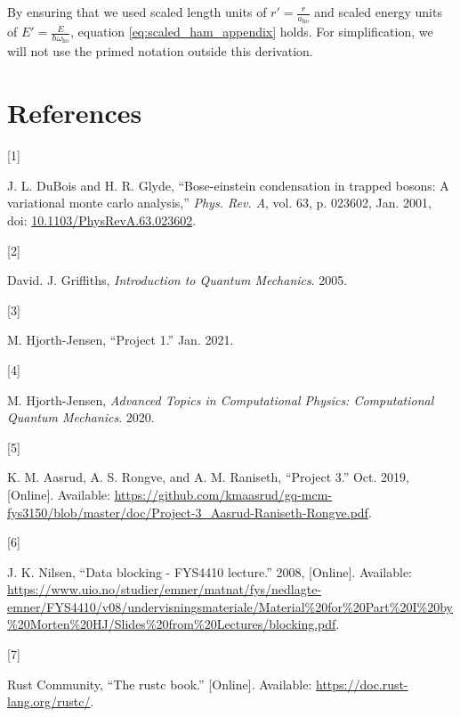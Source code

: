 \documentclass[
]{article}
\newlength{\cslhangindent}
\newlength{\csllabelwidth}
\newenvironment{CSLReferences}[2] %
 {%
  \setlength{\parindent}{0pt}
  \ifodd #1 \everypar{\setlength{\hangindent}{\cslhangindent}}\ignorespaces\fi
  \ifnum #2 > 0
  \setlength{\parskip}{#2\baselineskip}
  \fi
 }%
 {}
\newcommand{\CSLLeftMargin}[1]{\parbox[t]{\csllabelwidth}{#1}}
\newcommand{\CSLRightInline}[1]{\parbox[t]{\linewidth - \csllabelwidth}{#1}\break}
\begin{document}
By ensuring that we used scaled length units of
\(r' = \frac{r}{a_\text{ho}}\) and scaled energy units of
\(E' = \frac{E}{\hbar\omega_\text{ho}}\), equation
\eqref{eq:scaled_ham_appendix} holds. For simplification, we will not
use the primed notation outside this derivation.

\hypertarget{bibliography}{%
\section*{References}\label{bibliography}}

\hypertarget{refs}{}
\begin{CSLReferences}{0}{0}
\leavevmode{}%
\CSLLeftMargin{{[}1{]} }
\CSLRightInline{J. L. DuBois and H. R. Glyde, {``Bose-einstein
condensation in trapped bosons: A variational monte carlo analysis,''}
\emph{Phys. Rev. A}, vol. 63, p. 023602, Jan. 2001, doi:
\href{https://doi.org/10.1103/PhysRevA.63.023602}{10.1103/PhysRevA.63.023602}.}

\leavevmode{}%
\CSLLeftMargin{{[}2{]} }
\CSLRightInline{David. J. Griffiths, \emph{Introduction to Quantum
Mechanics}. 2005.}

\leavevmode{}%
\CSLLeftMargin{{[}3{]} }
\CSLRightInline{M. Hjorth-Jensen, {``Project 1.''} Jan. 2021.}

\leavevmode{}%
\CSLLeftMargin{{[}4{]} }
\CSLRightInline{M. Hjorth-Jensen, \emph{{Advanced Topics in
Computational Physics: Computational Quantum Mechanics}}. 2020.}

\leavevmode{}%
\CSLLeftMargin{{[}5{]} }
\CSLRightInline{K. M. Aasrud, A. S. Rongve, and A. M. Raniseth,
{``Project 3.''} Oct. 2019, {[}Online{]}. Available:
\url{https://github.com/kmaasrud/gq-mcm-fys3150/blob/master/doc/Project-3_Aasrud-Raniseth-Rongve.pdf}.}

\leavevmode{}%
\CSLLeftMargin{{[}6{]} }
\CSLRightInline{J. K. Nilsen, {``Data blocking - FYS4410 lecture.''}
2008, {[}Online{]}. Available:
\url{https://www.uio.no/studier/emner/matnat/fys/nedlagte-emner/FYS4410/v08/undervisningsmateriale/Material\%20for\%20Part\%20I\%20by\%20Morten\%20HJ/Slides\%20from\%20Lectures/blocking.pdf}.}

\leavevmode{}%
\CSLLeftMargin{{[}7{]} }
\CSLRightInline{Rust Community, {``The rustc book.''} {[}Online{]}.
Available: \url{https://doc.rust-lang.org/rustc/}.}

\end{CSLReferences}
\end{document}
